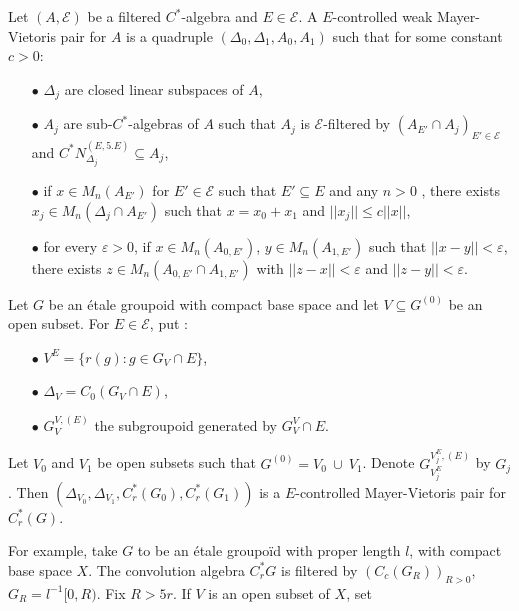 \begin{definition} \label{MVpair}
Let $(A,\mathcal E)$ be a filtered $C^*$-algebra and $E \in\mathcal E$. A $E$-controlled weak Mayer-Vietoris pair for $A$ is a quadruple $(\Delta_0,\Delta_1,A_0,A_1)$ such that for some constant $c>0$:\\

\begin{itemize}
\item[$\bullet$] $\Delta_j$ are closed linear subspaces of $A$, 
\item[$\bullet$] $A_j$ are sub-$C^*$-algebras of $A$ such that $A_j$ is $\mathcal E$-filtered by $(A_{E'}\cap A_j)_{E'\in\mathcal E}$ and $C^* N_{\Delta_j}^{(E,5.E)}\subseteq A_j$,
\item[$\bullet$] if $x\in M_n(A_{E'})$ for $E'\in\mathcal E$ such that $E'\subseteq E$ and any $n>0$ , there exists $x_j\in M_n(\Delta_j\cap A_{E'})$ such that $x=x_0+x_1$ and $||x_j||\leq c||x||$,
\item[$\bullet$] for every $\varepsilon >0$, if $x\in M_n(A_{0,E'})$, $y\in M_n(A_{1,E'})$ such that $||x-y||<\varepsilon$,  there exists $z\in M_n(A_{0,E'}\cap A_{1,E'})$ with $||z-x||<\varepsilon$ and $||z-y||<\varepsilon$. \\
\end{itemize}
\end{definition}

\begin{Expl} Let $G$ be an étale groupoid with compact base space and let $V\subseteq G^{(0)}$ be an open subset. For $E\in\mathcal E$, put :
\begin{itemize}
\item[$\bullet$] $V^E= \{r(g) : g\in G_{V}\cap E\}$,
\item[$\bullet$] $\Delta_V = C_0(G_{V}\cap E)$,
\item[$\bullet$] $G^{V,(E)}_V$ the subgroupoid generated by $G_V^V \cap E$.
\end{itemize} 
Let $V_0$ and $V_1$ be open subsets such that $G^{(0)} = V_0\ \cup \ V_1$. Denote $G_{V_j^E}^{V_j^E , (E)}$ by $G_j$. Then $(\Delta_{V_0},\Delta_{V_1}, C_r^*(G_0),C_r^*(G_1))$ is a $E$-controlled Mayer-Vietoris pair for $C^*_r (G)$. 
\end{Expl}

For example, take $G$ to be an étale groupoïd with proper length $l$, with compact base space $X$. The convolution algebra $C^*_r G$ is filtered by $(C_c(G_R))_{R>0}$, $G_R=l^{-1}[0,R)$. Fix $R>5r$. If $V$ is an open subset of $X$, set \\

